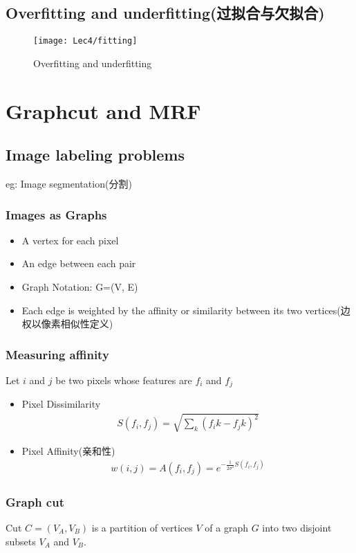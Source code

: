     \subsection{Overfitting and underfitting(过拟合与欠拟合)}
    \begin{figure}[H]
        \centering
        \texttt{[image: Lec4/fitting]}
        \caption{Overfitting and underfitting}
    \end{figure}

\section{Graphcut and MRF}
\subsection{Image labeling problems}
eg: Image segmentation(分割)

\subsubsection{Images as Graphs}
\begin{itemize}
    \item A vertex for each pixel
    \item An edge between each pair
    \item Graph Notation: G=(V, E)
    \item Each edge is weighted by the affinity or similarity between its two vertices(边权以像素相似性定义)
\end{itemize}
\subsubsection{Measuring affinity}
Let $i$ and $j$ be two pixels whose features are $f_i$ and $f_j$
\begin{itemize}
    \item Pixel Dissimilarity
    \begin{align*}
        S(f_i,f_j)=\sqrt{\sum_k(f_ik-f_jk)^2}
    \end{align*}
    \item Pixel Affinity(亲和性)
    \begin{align*}
        w(i,j)=A(f_i,f_j)=e^{-\frac{1}{2\sigma^2}S(f_i,f_j)}
    \end{align*}
\end{itemize}

\subsubsection{Graph cut}
Cut $C=(V_A, V_B)$ is a partition of vertices $V$ of a graph $G$ into two disjoint subsets $V_A$ and $V_B$.


